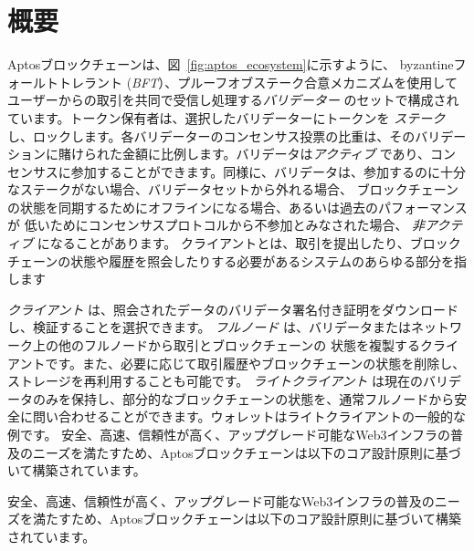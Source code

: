 \documentclass{article}
\begin{document}
\section{概要}
\label{sec:overview}

Aptosブロックチェーンは、図~\ref{fig:aptos_ecosystem}に示すように、 byzantineフォールトトレラント (\emph{BFT}）、プルーフオブステーク合意メカニズムを使用してユーザーからの取引を共同で受信し処理する\emph{バリデーター} のセットで構成されています。トークン保有者は、選択したバリデーターにトークンを \emph{ステーク} し、ロックします。各バリデーターのコンセンサス投票の比重は、そのバリデーションに賭けられた金額に比例します。バリデータは\emph{アクティブ} であり、コンセンサスに参加することができます。同様に、バリデータは、参加するのに十分なステークがない場合、バリデータセットから外れる場合、 ブロックチェーンの状態を同期するためにオフラインになる場合、あるいは過去のパフォーマンスが 低いためにコンセンサスプロトコルから不参加とみなされた場合、\emph{ 非アクティブ} になることがあります。 クライアントとは、取引を提出したり、ブロックチェーンの状態や履歴を照会したりする必要があるシステムのあらゆる部分を指します

\emph{クライアント} は、照会されたデータのバリデータ署名付き証明をダウンロードし、検証することを選択できます。
\emph{フルノード} は、バリデータまたはネットワーク上の他のフルノードから取引とブロックチェーンの 状態を複製するクライアントです。また、必要に応じて取引履歴やブロックチェーンの状態を削除し、ストレージを再利用することも可能です。
\emph{ライトクライアント} は現在のバリデータのみを保持し、部分的なブロックチェーンの状態を、通常フルノードから安全に問い合わせることができます。ウォレットはライトクライアントの一般的な例です。 安全、高速、信頼性が高く、アップグレード可能なWeb3インフラの普及のニーズを満たすため、Aptosブロックチェーンは以下のコア設計原則に基づいて構築されています。

安全、高速、信頼性が高く、アップグレード可能なWeb3インフラの普及のニーズを満たすため、Aptosブロックチェーンは以下のコア設計原則に基づいて構築されています。
\end{document}
